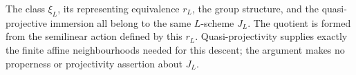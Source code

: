 \begin{remark}
  \label{route-rem-no-carrier-switch}

  The class \(\xi_L\), its representing equivalence \(r_L\), the group
  structure, and the quasi-projective immersion all belong to the same
  \(L\)-scheme \(J_L\). The quotient is formed from the semilinear
  action defined by this \(r_L\). Quasi-projectivity supplies exactly
  the finite affine neighbourhoods needed for this descent; the argument
  makes no properness or projectivity assertion about \(J_L\).
\end{remark}
